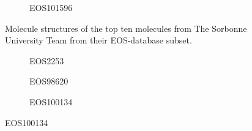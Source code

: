 \documentclass[11pt, letterpaper, titlepage]{article}
\begin{document}
\begin{figure}
     \hfill
     \begin{subfigure}[b]{\textwidth}
         \centering
         
         \caption{EOS101596}
         \label{fig:EOS101596}
     \end{subfigure}
        \caption{Molecule structures of the top ten molecules from The Sorbonne University Team from their EOS-database subset.}
        \label{fig:our_top_ten_zinc}
\end{figure}







\begin{figure}

     \centering
     \begin{subfigure}[b]{0.3\textwidth}
         \centering
         
         \caption{EOS2253}
         \label{fig:EOS2253}
     \end{subfigure}
     \hfill
     \begin{subfigure}[b]{0.3\textwidth}
         \centering
         
         \caption{EOS98620}
         \label{fig:EOS98620}
     \end{subfigure}
     \hfill
     \begin{subfigure}[b]{0.3\textwidth}
         \centering
         
         \caption{EOS100134}
         \label{fig:EOS100134}
     \end{subfigure}


\end{figure}
\end{document}
